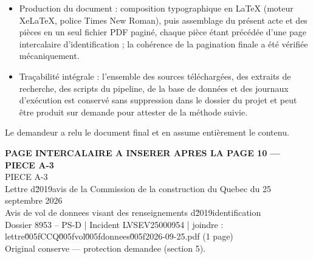 \documentclass[12pt,a4paper]{article}
\begin{document}
\begin{itemize}
  \item Production du document : composition typographique en LaTeX (moteur XeLaTeX, police Times New Roman), puis assemblage du présent acte et des pièces en un seul fichier PDF paginé, chaque pièce étant précédée d’une page intercalaire d’identification ; la cohérence de la pagination finale a été vérifiée mécaniquement.
  \item Traçabilité intégrale : l’ensemble des sources téléchargées, des extraits de recherche, des scripts du pipeline, de la base de données et des journaux d’exécution est conservé sans suppression dans le dossier du projet et peut être produit sur demande pour attester de la méthode suivie.
\end{itemize}

Le demandeur a relu le document final et en assume entièrement le contenu.


\newpage
\thispagestyle{empty}
\begin{center}
{\bfseries PAGE INTERCALAIRE A INSERER APRES LA PAGE 10 --- PIECE A-3}\\[10pt]
{\large PIECE A-3}\\[6pt]
Lettre d\u2019avis de la Commission de la construction du Quebec du 25 septembre 2026\\
Avis de vol de donnees visant des renseignements d\u2019identification\\[6pt]
{\small Dossier 8953 -- PS-D \;|\; Incident LVSEV25000954 \;|\; joindre : lettre\u005fCCQ\u005fvol\u005fdonnees\u005f2026-09-25.pdf (1 page)}\\
{\small Original conserve --- protection demandee (section 5).}
\end{center}
\end{document}
